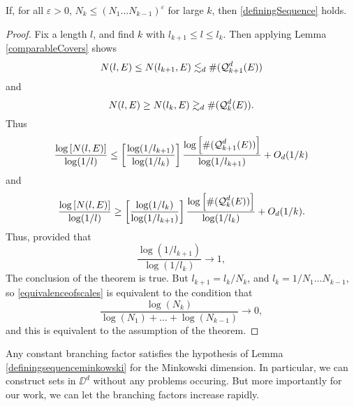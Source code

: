\begin{lemma} \label{definingsequenceminkowski}
	If, for all $\varepsilon > 0$, $N_k \leq (N_1 \dots N_{k-1})^\varepsilon$ for large $k$, then \eqref{definingSequence} holds.
\end{lemma}
\begin{proof}
	Fix a length $l$, and find $k$ with $l_{k+1} \leq l \leq l_k$. Then applying Lemma \ref{comparableCovers} shows
	\[ N(l,E) \leq N(l_{k+1},E) \lesssim_d \#(\operatorname{\mathcal{Q}}_{k+1}^d(E)) \]
	and
	\[ N(l,E) \geq N(l_k,E) \gtrsim_d \#(\operatorname{\mathcal{Q}}_k^d(E)). \]
	Thus
	\[ \frac{\log \left[ N(l,E) \right]}{\log(1/l)} \leq \left[ \frac{\log(1/l_{k+1})}{\log(1/l_k)} \right] \frac{\log \left[ \#(\operatorname{\mathcal{Q}}_{k+1}^d(E)) \right]}{\log(1/l_{k+1})} + O_d(1/k) \]
	and
	\[ \frac{\log \left[ N(l,E) \right]}{\log(1/l)} \geq \left[ \frac{\log(1/l_k)}{\log(1/l_{k+1})} \right] \frac{\log \left[ \#(\operatorname{\mathcal{Q}}_k^d(E)) \right]}{\log(1/l_k)} + O_d(1/k). \]
	Thus, provided that
	\begin{equation} \label{equivalenceofscales}
		\frac{\log(1/l_{k+1})}{\log(1/l_k)} \to 1,
	\end{equation}
	The conclusion of the theorem is true. But $l_{k+1} = l_k/N_k$, and $l_k = 1/N_1 \dots N_{k-1}$, so \eqref{equivalenceofscales} is equivalent to the condition that
	\[ \frac{\log(N_k)}{\log(N_1) + \dots + \log(N_{k-1})} \to 0, \]
	and this is equivalent to the assumption of the theorem.
\end{proof}

Any constant branching factor satisfies the hypothesis of Lemma \ref{definingsequenceminkowski} for the Minkowski dimension. In particular, we can construct sets in $\DD^d$ without any problems occuring. But more importantly for our work, we can let the branching factors increase rapidly.

